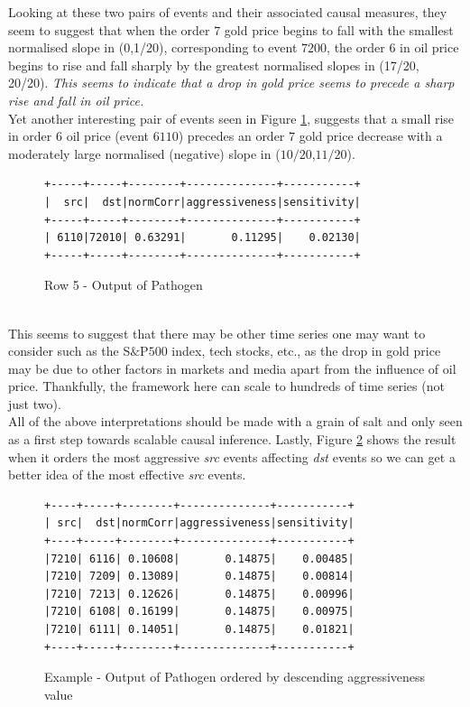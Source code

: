 \documentclass[a4, 11pt]{article}
\begin{document}
Looking at these two pairs of events and their associated causal measures, they seem to suggest that when the order $7$ gold price begins to fall with the smallest normalised slope in (0,1/20), corresponding to event $7200$, the order $6$ in oil price begins to rise and fall sharply by the greatest normalised slopes in (17/20, 20/20). \textit{This seems to indicate that a drop in gold price seems to precede a sharp rise and fall in oil price.}\\[2ex]
Yet another interesting pair of events seen in Figure \ref{fig:graph4}, suggests that a small rise in order $6$ oil price (event $6110$) precedes an order $7$ gold price decrease with a moderately large normalised (negative) slope in ($10/20$,$11/20$).
\begin{figure}[!ht]
\centering
    \begin{BVerbatim}[baselinestretch=0.1,fontsize=\fontsize{12}{0}\selectfont]
+-----+-----+--------+--------------+-----------+
|  src|  dst|normCorr|aggressiveness|sensitivity|
+-----+-----+--------+--------------+-----------+
| 6110|72010| 0.63291|       0.11295|    0.02130|
+-----+-----+--------+--------------+-----------+
    \end{BVerbatim}
    \caption{Row 5 - Output of Pathogen}
    \label{fig:graph4}
\end{figure}
\\This seems to suggest that there may be other time series one may want to consider such as the S$\&$P$500$ index, tech stocks, etc., as the drop in gold price may be due to other factors in markets and media apart from the influence of oil price. Thankfully, the framework here can scale to hundreds of time series (not just two).\\[2ex]
All of the above interpretations should be made with a grain of salt and only seen as a first step towards scalable causal inference. Lastly, Figure \ref{fig:graph5} shows the result when it orders the most aggressive \textit{src} events affecting \textit{dst} events so we can get a better idea of the most effective \textit{src} events.
\begin{figure}[!ht]
\centering
    \begin{BVerbatim}[baselinestretch=0.1,fontsize=\fontsize{12}{0}\selectfont]
+----+-----+--------+--------------+-----------+
| src|  dst|normCorr|aggressiveness|sensitivity|
+----+-----+--------+--------------+-----------+
|7210| 6116| 0.10608|       0.14875|    0.00485|
|7210| 7209| 0.13089|       0.14875|    0.00814|
|7210| 7213| 0.12626|       0.14875|    0.00996|
|7210| 6108| 0.16199|       0.14875|    0.00975|
|7210| 6111| 0.14051|       0.14875|    0.01821|
+----+-----+--------+--------------+-----------+
    \end{BVerbatim}
    \caption{Example - Output of Pathogen ordered by descending aggressiveness value}
    \label{fig:graph5}
\end{figure}
\end{document}
